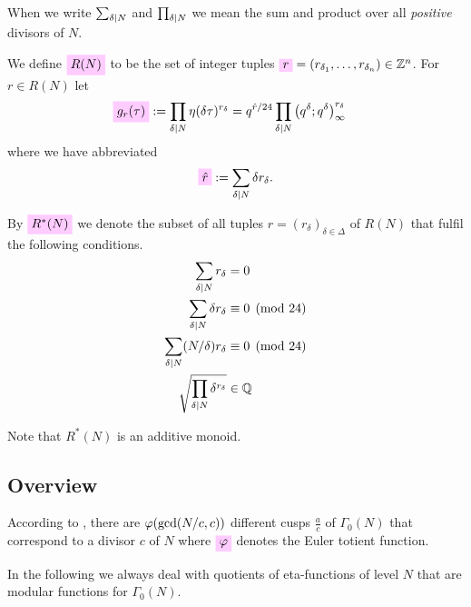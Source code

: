 \documentclass{article}
\begin{document}
When we write $\sum_{\delta \mid N}$ and $\prod_{\delta \mid N}$ we mean the sum
and product over all \emph{positive} divisors of $N$.

We define $\defineNotation[RN]{R(N)}$ to be the set of integer tuples
$\defineNotation[r]{r} = (r_{\delta_1}, \ldots,
r_{\delta_n})\in \setZ^n$.
%
For $r\in R(N)$ let
\begin{align}
  \defineNotation[g-r-tau]{g_r(\tau)}
  &:=
    \divisorprod{N} \eta(\delta\tau)^{r_\delta}
    =
    q^{{\sumdelta{r}}/{24}}
      \divisorprod{N} \eulerFunction{\delta}^{r_\delta}
  \label{eq:g_r(tau)}
\end{align}
where we have abbreviated
\begin{gather}
  \defineNotation[r^{}]{\sumdelta{r}} := \divisorsum{N} \delta r_\delta.
\end{gather}




By $\defineNotation[R*N]{R^*(N)}$ we denote the subset of all tuples
$r=(r_\delta)_{\delta\in\Delta}$ of $R(N)$ that fulfil the following
conditions.
\begin{align}
 \sum_{\delta \mid N} r_\delta &= 0\label{eq:sum=0}\\
 \sum_{\delta \mid N} \delta r_\delta &\equiv 0\pmod{24}\label{eq:sigmainfinity}\\
 \sum_{\delta \mid N} (N/\delta)r_\delta &\equiv 0\pmod{24}\label{eq:sigma0}\\
 \sqrt{\prod_{\delta \mid N}\delta^{r_\delta}} &\in \mathbb{Q}\label{eq:productsquare}
\end{align}

Note that $R^*(N)$ is an additive monoid.

\subsection{Overview}

According to
\cite[Lemma~5.3]{Radu:AlgebraicRelationsInvolvingEtaQuotients:2016},
there are $\varphi(\gcd(N/c, c))$ different cusps $\frac{a}{c}$ of
$\Gamma_0(N)$ that correspond to a divisor $c$ of $N$ where
$\defineNotation[phi]{\eulerphi}$ denotes the Euler totient function.

In the following we always deal with quotients of eta-functions of
level $N$ that are modular functions for $\Gamma_0(N)$.
\end{document}
